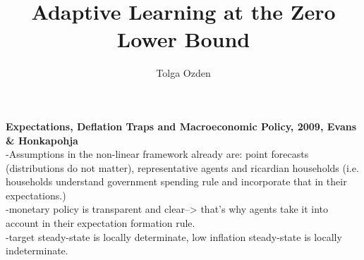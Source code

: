 \documentclass[12pt,reqno]{article}
\title{Adaptive Learning at the Zero Lower Bound}
\author{Tolga Ozden}
\numberwithin{equation}{section}
\begin{document}
\noindent
\textbf{Expectations, Deflation Traps and Macroeconomic Policy, 2009, Evans \& Honkapohja} \\

-Assumptions in the non-linear framework already are: point forecasts (distributions do not matter), representative agents and ricardian households (i.e. households understand 
government spending rule and incorporate that in their expectations.)\\
-monetary policy is transparent and clear--> that's why agents take it into account in their expectation formation rule. \\
-target steady-state is locally determinate, low inflation steady-state is locally indeterminate.
\end{document}
